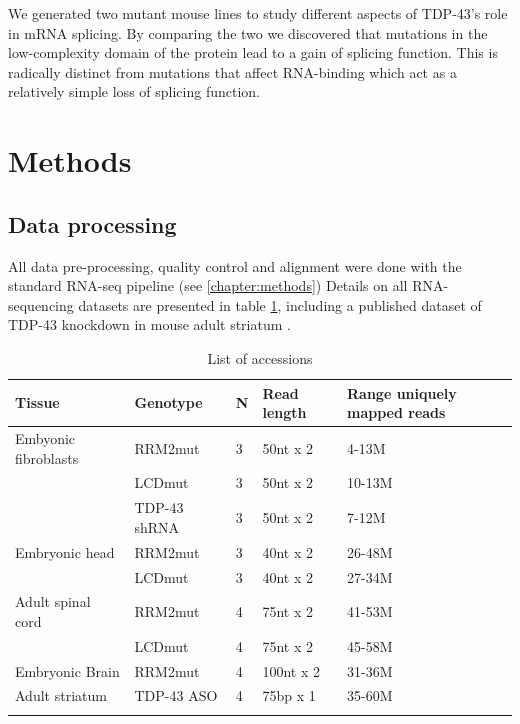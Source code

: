 We generated two mutant mouse lines to study different aspects of TDP-43's role in mRNA splicing.
By comparing the two we discovered that mutations in the low-complexity domain of the protein lead to a gain of splicing function. This is radically distinct from mutations that affect RNA-binding which act as a relatively simple loss of splicing function.


\section{Methods}

\subsection{Data processing}

All data pre-processing, quality control and alignment were done with the standard RNA-seq pipeline (see \autoref{chapter:methods})
Details on all RNA-sequencing datasets are presented in table \ref{table:tdp_mice_sequencing}, including a published dataset of TDP-43 knockdown in mouse adult striatum \citep{Polymenidou2011}.

\begin{table}[h!]
	\caption{List of accessions}
	\begin{footnotesize}
		\begin{tabular}{lllll}
			Tissue & Genotype & N &	Read length & Range uniquely mapped reads\\
			\hline	
			Embyonic fibroblasts & RRM2mut &3 &50nt	x 2 & 4-13M\\
			& LCDmut & 3 & 50nt	x	2 & 10-13M\\
			& TDP-43 shRNA & 3 & 50nt x 2 & 7-12M\\
			Embryonic head & RRM2mut & 3 & 40nt	x	2 & 26-48M\\
			& LCDmut & 3 & 40nt	x 2 & 27-34M \\
			Adult	spinal	cord & RRM2mut & 4 & 75nt x	2 & 41-53M\\
			& LCDmut & 4 & 75nt x 2 & 45-58M\\
			Embryonic	Brain	& RRM2mut & 4 & 100nt x 2 & 31-36M\\
			Adult striatum & TDP-43 ASO & 4 & 75bp x 1 & 35-60M\\
			\citep{Polymenidou2011-hs}
		\end{tabular}
	\end{footnotesize}
	\label{table:tdp_mice_sequencing}
\end{table}


